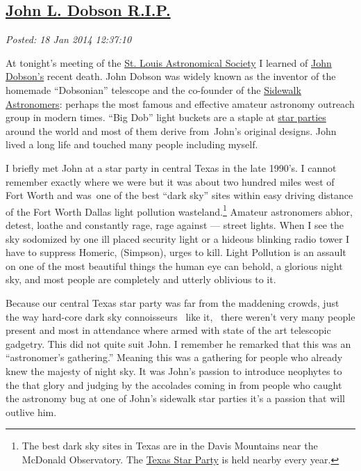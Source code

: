 %

\subsection*{\href{http://bakerjd99.wordpress.com/2014/01/18/john-l-dobson-r-i-p/}{John L. Dobson R.I.P.}}


\noindent\emph{Posted: 18 Jan 2014 12:37:10}
\vspace{6pt}

At tonight's meeting of the \href{http://www.slasonline.org/}{St. Louis
Astronomical Society} I learned of
\href{http://www.universetoday.com/108150/john-dobson-inventor-of-the-popular-dobsonian-telescope-dead-at-98/}{John
Dobson's} recent death. John Dobson was widely known as the inventor of
the homemade ``Dobsonian'' telescope and the co-founder of the
\href{http://www.sidewalkastronomers.us/}{Sidewalk Astronomers}: perhaps
the most famous and effective amateur astronomy outreach group in modern
times. ``Big Dob'' light buckets are a staple at
\href{http://stardate.org/nightsky/star\_parties}{star parties} around
the world and most of them derive from~John's original designs. John
lived a long life and touched many people including myself.

I briefly met John at a star party in central Texas in the late 1990's.
I cannot remember exactly where we were but it was about two hundred
miles west of Fort Worth and was~one of the best ``dark sky'' sites
within easy driving distance of the Fort Worth Dallas light pollution
wasteland.\footnote{
The best dark sky sites in
Texas are in the Davis Mountains near the McDonald Observatory. The
\href{http://texasstarparty.org/}{Texas Star Party} is held nearby every year.
} Amateur astronomers
abhor, detest, loathe and constantly rage, rage against --- street
lights. When I see the sky sodomized by one ill placed security light or
a hideous blinking radio tower I have to suppress Homeric, (Simpson),
urges to kill. Light Pollution is an assault on one of the most
beautiful things the human eye can behold, a glorious night sky, and
most people are completely and utterly oblivious to it.

Because our central Texas star party was far from the maddening crowds,
just the way hard-core dark sky connoisseurs ~like it, ~there weren't
very many people present and most in attendance where armed with state
of the art telescopic gadgetry. This did not quite suit John. I remember
he remarked that this was an ``astronomer's gathering.'' Meaning this
was a gathering for people who already knew the majesty of night sky. It
was John's passion to introduce neophytes to the that glory and judging
by the accolades coming in from people who caught the astronomy bug at
one of John's sidewalk star parties it's a passion that will outlive
him.

